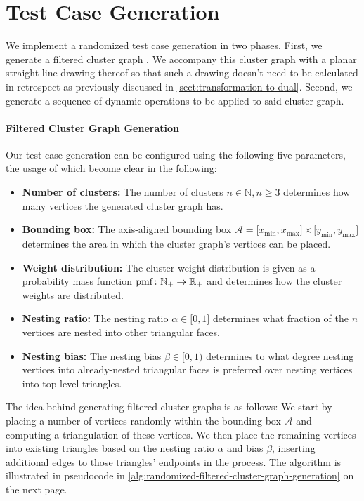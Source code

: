 \section{Test Case Generation}
\label{sect:test-case-generation}

We implement a randomized test case generation in two phases.
First, we generate a filtered cluster graph \clustergraph{}.
We accompany this cluster graph with a planar straight-line drawing \clusterdrawing{} thereof so that such a drawing doesn't need to be calculated in retrospect as previously discussed in \cref{sect:transformation-to-dual}.
Second, we generate a sequence of dynamic operations to be applied to said cluster graph.

\paragraph{Filtered Cluster Graph Generation}

Our test case generation can be configured using the following five parameters, the usage of which become clear in the following:
%
\begin{itemize}
\item \textbf{Number of clusters:} The number of clusters $n \in \mathbb{N}, n \geq 3$ determines how many vertices the generated cluster graph \clustergraph{} has.
\item \textbf{Bounding box:} The axis-aligned bounding box $\mathcal{A} = \lbrack x_\text{min}, x_\text{max} \rbrack \times \lbrack y_\text{min}, y_\text{max} \rbrack$ determines the area in which the cluster graph's vertices can be placed.
\item \textbf{Weight distribution:} The cluster weight distribution is given as a probability mass function $\operatorname{pmf} \colon \mathbb{N}_+ \to \mathbb{R}_+$ and determines how the cluster weights are distributed.
\item \textbf{Nesting ratio:} The nesting ratio $\alpha \in \lbrack 0, 1 \rbrack$ determines what fraction of the $n$ vertices are nested into other triangular faces.
\item \textbf{Nesting bias:} The nesting bias $\beta \in \lbrack 0, 1 )$ determines to what degree nesting vertices into already-nested triangular faces is preferred over nesting vertices into top-level triangles.
\end{itemize}

The idea behind generating filtered cluster graphs \clustergraph{} is as follows:
We start by placing a number of vertices randomly within the bounding box $\mathcal{A}$ and computing a triangulation of these vertices.
We then place the remaining vertices into existing triangles based on the nesting ratio $\alpha$ and bias $\beta$, inserting additional edges to those triangles' endpoints in the process.
The algorithm is illustrated in pseudocode in \cref{alg:randomized-filtered-cluster-graph-generation} on the next page.

